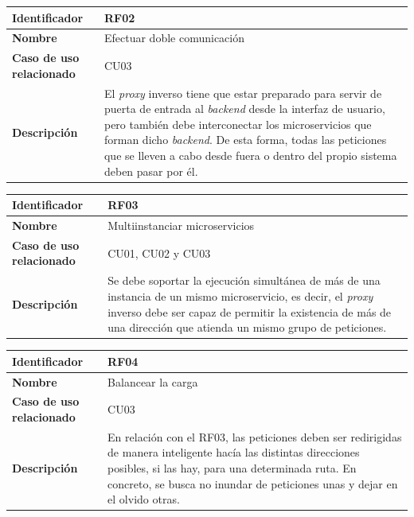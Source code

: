 \documentclass[11pt,spanish,listoffigures]{tfgetsinf}
\begin{document}
\begin{center} \begin{tabular}{| l | p{9.5cm} |}
\hline
\textbf{Identificador} & RF02
\\ \hline
\textbf{Nombre} & Efectuar doble comunicación
\\ \hline
\textbf{Caso de uso relacionado} & CU03
\\ \hline
\textbf{Descripción} & El \emph{proxy} inverso tiene que estar preparado para servir de puerta de entrada al \emph{backend} desde la interfaz de usuario, pero también debe interconectar los microservicios que forman dicho \emph{backend}. De esta forma, todas las peticiones que se lleven a cabo desde fuera o dentro del propio sistema deben pasar por él.
\\ \hline \end{tabular} \end{center}

\begin{center} \begin{tabular}{| l | p{9.5cm} |}
\hline
\textbf{Identificador} & RF03
\\ \hline
\textbf{Nombre} & Multiinstanciar microservicios
\\ \hline
\textbf{Caso de uso relacionado} & CU01, CU02 y CU03
\\ \hline
\textbf{Descripción} & Se debe soportar la ejecución simultánea de más de una instancia de un mismo microservicio, es decir, el \emph{proxy} inverso debe ser capaz de permitir la existencia de más de una dirección que atienda un mismo grupo de peticiones.
\\ \hline \end{tabular} \end{center}

\begin{center} \begin{tabular}{| l | p{9.5cm} |}
\hline
\textbf{Identificador} & RF04
\\ \hline
\textbf{Nombre} & Balancear la carga
\\ \hline
\textbf{Caso de uso relacionado} & CU03
\\ \hline
\textbf{Descripción} & En relación con el RF03, las peticiones deben ser redirigidas de manera inteligente hacía las distintas direcciones posibles, si las hay, para una determinada ruta. En concreto, se busca no inundar de peticiones unas y dejar en el olvido otras.
\\ \hline \end{tabular} \end{center}
\end{document}
